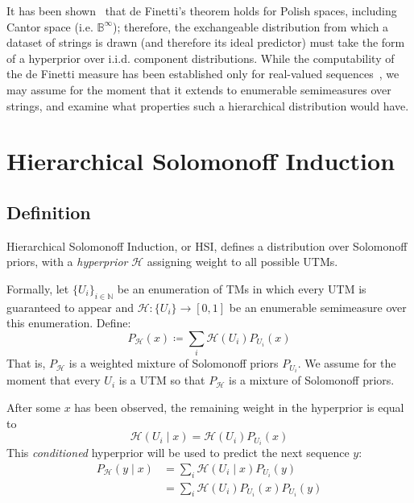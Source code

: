 \documentclass[11pt]{article}
\newcommand{\Eta}{\mathcal{H}}
\begin{document}
It has been shown~\citep{HewittSavage1955} that de Finetti's theorem holds for Polish spaces, including Cantor space (i.e. $\mathbb{B}^\infty$); therefore, the exchangeable distribution from which a dataset of strings is drawn (and therefore its ideal predictor) must take the form of a hyperprior over i.i.d. component distributions.
While the computability of the de Finetti measure has been established only for real-valued sequences~\citep{FreerRoy2009, FreerRoy2012}, we may assume for the moment that it extends to enumerable semimeasures over strings, and examine what properties such a hierarchical distribution would have.


\section{Hierarchical Solomonoff Induction}

\subsection{Definition}

Hierarchical Solomonoff Induction, or HSI, defines a distribution over Solomonoff priors, with a \textit{hyperprior} $\Eta$ assigning weight to all possible UTMs.

Formally, let $\{U_i\}_{i\in\mathbb{N}}$ be an enumeration of TMs in which every UTM is guaranteed to appear and $\Eta: \{U_i\} \to [0,1]$ be an enumerable semimeasure over this enumeration. Define:
\begin{equation}
\label{eq:hsi}
    P_\Eta(x) \coloneq \sum_i \Eta(U_i) P_{U_i}(x)
\end{equation}
That is, $P_\Eta$ is a weighted mixture of Solomonoff priors $P_{U_i}$.
We assume for the moment that every $U_i$ is a UTM so that $P_\Eta$ is a mixture of Solomonoff priors.

After some $x$ has been observed, the remaining weight in the hyperprior is equal to
\begin{equation}
\label{eq:eta-sequence}
    \Eta(U_i \mid x) = \Eta(U_i) P_{U_i}(x)
\end{equation}
This \textit{conditioned} hyperprior will be used to predict the next sequence $y$:
\begin{equation}
\label{eq:hsi-sequence}
\begin{split}
    P_\Eta(y \mid x) &= \sum_i \Eta(U_i\mid x) P_{U_i}(y)\\
    &= \sum_i \Eta(U_i) P_{U_i}(x) P_{U_i}(y)
\end{split}
\end{equation}
\end{document}
